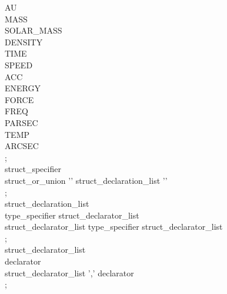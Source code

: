 \documentclass[11pt]{article}
\begin{document}
{\hspace*{1cm}   AU\\
\hspace*{1cm}   MASS\\
\hspace*{1cm}   SOLAR\_MASS\\
\hspace*{1cm}   DENSITY\\
\hspace*{1cm}   TIME\\
\hspace*{1cm}   SPEED\\
\hspace*{1cm}   ACC\\
\hspace*{1cm}   ENERGY\\
\hspace*{1cm}   FORCE\\
\hspace*{1cm}   FREQ\\
\hspace*{1cm}   PARSEC\\
\hspace*{1cm}   TEMP\\
\hspace*{1cm}   ARCSEC\\
\hspace*{1cm};\\
struct\_specifier\\
\hspace*{1cm}  struct\_or\_union '{' struct\_declaration\_list '}'\\
\hspace*{1cm};\\
struct\_declaration\_list\\
\hspace*{1cm} type\_specifier struct\_declarator\_list\\
\hspace*{1cm}   struct\_declarator\_list type\_specifier struct\_declarator\_list\\
\hspace*{1cm};\\
struct\_declarator\_list\\
\hspace*{1cm} declarator\\
\hspace*{1cm}   struct\_declarator\_list ',' declarator\\
\hspace*{1cm};\\
}
\end{document}

